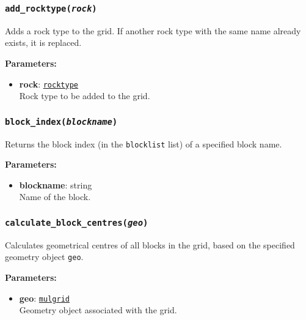 \begin{snugshade}
\subsubsection{\texttt{add\_rocktype(\emph{rock})}}
\end{snugshade}
\label{sec:t2grid:add_rocktype}

Adds a rock type to the grid.  If another rock type with the same name already exists, it is replaced.

\textbf{Parameters:}
\begin{itemize}
\item \textbf{rock}: \hyperref[rocktypeobjects]{\texttt{rocktype}}\\
  Rock type to be added to the grid.
\end{itemize}

\begin{snugshade}
\subsubsection{\texttt{block\_index(\emph{blockname})}}
\end{snugshade}
\label{sec:t2grid:block_index}

Returns the block index (in the \texttt{blocklist} list) of a specified block name.

\textbf{Parameters:}
\begin{itemize}
\item \textbf{blockname}: string\\
  Name of the block.
\end{itemize}

\begin{snugshade}
\subsubsection{\texttt{calculate\_block\_centres(\emph{geo})}}
\end{snugshade}
\label{sec:t2grid:calculate_block_centres}

Calculates geometrical centres of all blocks in the grid, based on the specified geometry object \texttt{geo}.

\textbf{Parameters:}
\begin{itemize}
\item \textbf{geo}: \hyperref[mulgrids]{\texttt{mulgrid}}\\
  Geometry object associated with the grid.
\end{itemize}

